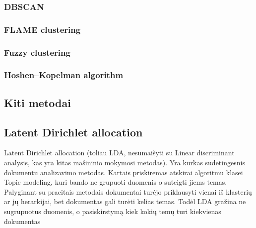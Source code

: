 \documentclass{VUMIFInfKursinis}
\begin{document}
\subsubsection{DBSCAN}
\subsubsection{FLAME clustering}
\subsubsection{Fuzzy clustering}
\subsubsection{Hoshen–Kopelman algorithm}

\subsection{Kiti metodai}
\subsection{Latent Dirichlet allocation}
Latent Dirichlet allocation (toliau LDA, nesumaišyti su Linear discriminant analysis, kas yra kitas mašininio mokymosi metodas). Yra kurkas sudetingesnis dokumentu analizavimo metodas. Kartais priskiremas atskirai algoritmu klasei Topic modeling, kuri bando ne grupuoti duomenis o suteigti jiems temas. Palyginant su praeitais metodais dokumentai turėjo priklausyti vienai iš klasterių ar jų herarkijai, bet dokumentas gali turėti kelias temas. 
Todėl LDA gražina ne sugrupuotus duomenis, o pasiskirstymą kiek kokių temų turi kiekvienas dokumentas  
\end{document}
